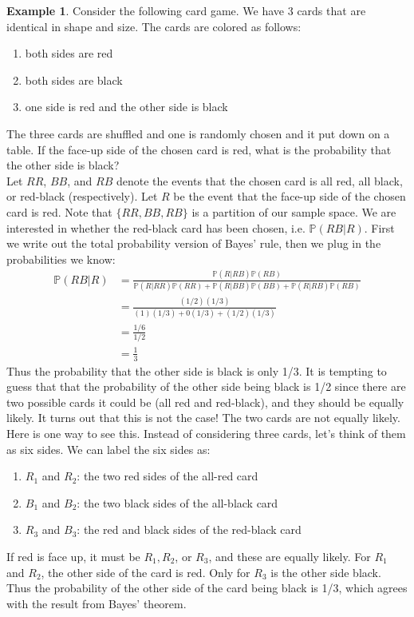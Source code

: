 \documentclass[12pt]{article}
\theoremstyle{definition}
\newtheorem*{example}{Example}
\theoremstyle{remark}
\def\P{{\mathbb P}}
\begin{document}
\begin{example}Consider the following card game. We have 3 cards that are identical in shape and size. The cards are colored as follows:
\begin{enumerate}
\item both sides are red
\item both sides are black
\item one side is red and the other side is black
\end{enumerate}
The three cards are shuffled and one is randomly chosen and it put down on a table. If the face-up side of the chosen card is red, what is the probability that the other side is black?\\

Let $RR$, $BB$, and $RB$ denote the events that the chosen card is all red, all black, or red-black (respectively). Let $R$ be the event that the face-up side of the chosen card is red. Note that $\{RR, BB, RB\}$ is a partition of our sample space. We are interested in whether the red-black card has been chosen, i.e. $\P(RB|R)$. First we write out the total probability version of Bayes' rule, then we plug in the probabilities we know:
\begin{align*}
\P(RB|R) &= \frac{ \P(R|RB) \P(RB) }{ \P(R|RR)\P(RR) + \P(R|BB)\P(BB) + \P(R|RB)\P(RB) } \\
&= \frac{(1/2)(1/3)}{ (1)(1/3) + 0(1/3) + (1/2)(1/3) } \\
&= \frac{1/6}{1/2} \\
&= \frac{1}{3}
\end{align*}
Thus the probability that the other side is black is only 1/3. It is tempting to guess that that the probability of the other side being black is 1/2 since there are two possible cards it could be (all red and red-black), and they should be equally likely. It turns out that this is not the case! The two cards are not equally likely. Here is one way to see this. Instead of considering three cards, let's think of them as six sides. We can label the six sides as:
\begin{enumerate}
\item $R_1$ and $R_2$: the two red sides of the all-red card
\item $B_1$ and $B_2$: the two black sides of the all-black card
\item $R_3$ and $B_3$: the red and black sides of the red-black card
\end{enumerate}
If red is face up, it must be $R_1, R_2$, or $R_3$, and these are equally likely. For $R_1$ and $R_2$, the other side of the card is red. Only for $R_3$ is the other side black. Thus the probability of the other side of the card being black is 1/3, which agrees with the result from Bayes' theorem.
\end{example}
\end{document}
